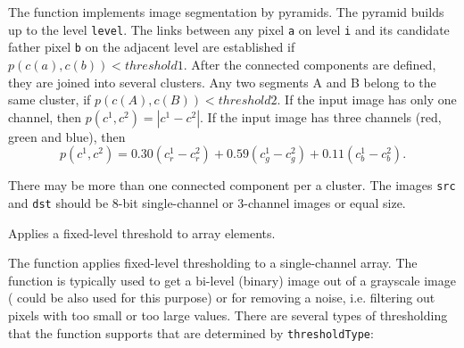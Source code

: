 The function implements image segmentation by pyramids. The pyramid builds up to the level \texttt{level}. The links between any pixel \texttt{a} on level \texttt{i} and its candidate father pixel \texttt{b} on the adjacent level are established if
$p(c(a),c(b))<threshold1$.
After the connected components are defined, they are joined into several clusters.
Any two segments A and B belong to the same cluster, if $p(c(A),c(B))<threshold2$.
If the input image has only one channel, then $p(c^1,c^2)=|c^1-c^2|$.
If the input image has three channels (red, green and blue), then
\[
  p(c^1,c^2) = 0.30 (c^1_r - c^2_r) +
               0.59 (c^1_g - c^2_g) +
               0.11 (c^1_b - c^2_b).
\]

There may be more than one connected component per a cluster. The images \texttt{src} and \texttt{dst} should be 8-bit single-channel or 3-channel images or equal size.

Applies a fixed-level threshold to array elements.


\begin{description}
\end{description}

The function applies fixed-level thresholding
to a single-channel array. The function is typically used to get a
bi-level (binary) image out of a grayscale image ( could
be also used for this purpose) or for removing a noise, i.e. filtering
out pixels with too small or too large values. There are several
types of thresholding that the function supports that are determined by
\texttt{thresholdType}:

\begin{description}
\end{description}

